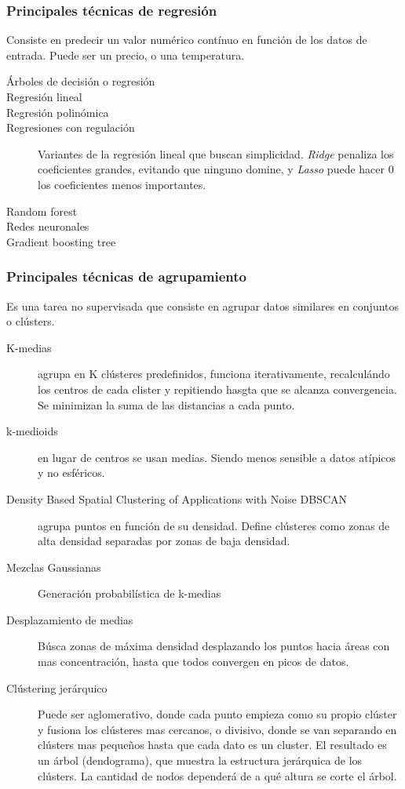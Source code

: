     \subsubsection{Principales técnicas de regresión}
        Consiste en predecir un valor numérico contínuo en función de los datos de entrada. Puede ser un precio, o una temperatura.
        \begin{description}
            \item[Árboles de decisión o regresión]
            \item[Regresión lineal]
            \item[Regresión polinómica]
            \item[Regresiones con regulación] Variantes de la regresión lineal que buscan simplicidad. \textit{Ridge} penaliza los coeficientes grandes, evitando que ninguno domine, y \textit{Lasso} puede hacer 0 los coeficientes menos importantes.
            \item[Random forest]
            \item[Redes neuronales]
            \item[Gradient boosting tree]
        \end{description}

    \subsubsection{Principales técnicas de agrupamiento}
        Es una tarea no supervisada que consiste en agrupar datos similares en conjuntos o clústers.
        \begin{description}
            \item[K-medias] agrupa en K clústeres predefinidos, funciona iterativamente, recalculándo los centros de cada clister y repitiendo hasgta que se alcanza convergencia. Se minimizan la suma de las distancias a cada punto.
            \item[k-medioids] en lugar de centros se usan medias. Siendo menos sensible a datos atípicos y no esféricos.
            \item[Density Based Spatial Clustering of Applications with Noise DBSCAN] agrupa puntos en función de su densidad. Define clústeres como zonas de alta densidad separadas por zonas de baja densidad.
            \item[Mezclas Gaussianas] Generación probabilística de k-medias
            \item[Desplazamiento de medias] Búsca zonas de máxima densidad desplazando los puntos hacia áreas con mas concentración, hasta que todos convergen en picos de datos.
            \item[Clústering jerárquico] Puede ser aglomerativo, donde cada punto empieza como su propio clúster y fusiona los clústeres mas cercanos, o divisivo, donde se van separando en clústers mas pequeños hasta que cada dato es un cluster. El resultado es un árbol (dendograma), que muestra la estructura jerárquica de los clústers. La cantidad de nodos dependerá de a qué altura se corte el árbol.
        \end{description}

